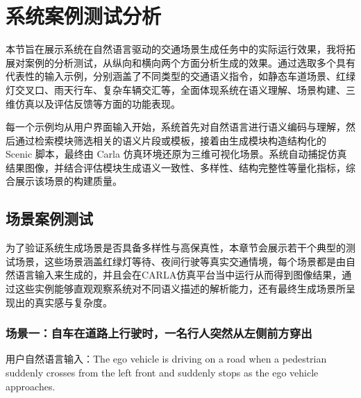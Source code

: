 \chapter{系统案例测试分析}

本节旨在展示系统在自然语言驱动的交通场景生成任务中的实际运行效果，我将拓展对案例的分析测试，从纵向和横向两个方面分析生成的效果。通过选取多个具有代表性的输入示例，分别涵盖了不同类型的交通语义指令，如静态车道场景、红绿灯交叉口、雨天行车、复杂车辆交汇等，全面体现系统在语义理解、场景构建、三维仿真以及评估反馈等方面的功能表现。

每一个示例均从用户界面输入开始，系统首先对自然语言进行语义编码与理解，然后通过检索模块筛选相关的语义片段或模板，接着由生成模块构造结构化的 Scenic 脚本，最终由 Carla 仿真环境还原为三维可视化场景。系统自动捕捉仿真结果图像，并结合评估模块生成语义一致性、多样性、结构完整性等量化指标，综合展示该场景的构建质量。
\section{场景案例测试}
为了验证系统生成场景是否具备多样性与高保真性，本章节会展示若干个典型的测试场景，这些场景涵盖红绿灯等待、夜间行驶等真实交通情境，每个场景都是由自然语言输入来生成的，并且会在CARLA仿真平台当中运行从而得到图像结果，通过这些实例能够直观观察系统对不同语义描述的解析能力，还有最终生成场景所呈现出的真实感与复杂度。



\subsection{场景一：自车在道路上行驶时，一名行人突然从左侧前方穿出}
用户自然语言输入：The ego vehicle is driving on a road when a pedestrian suddenly crosses from the left front and suddenly stops as the ego vehicle approaches.

\vspace{1em}

